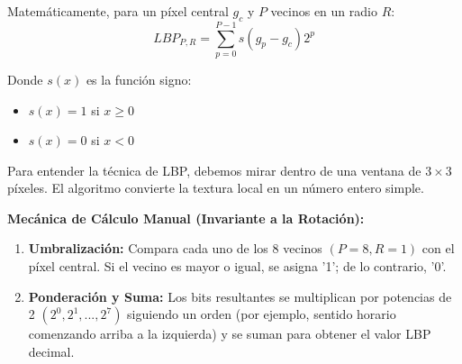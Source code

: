 Matemáticamente, para un píxel central $g_{c}$ y $P$ vecinos en un radio $R$:
\begin{equation}
    LBP_{P,R}=\sum_{p=0}^{P-1}s(g_{p}-g_{c})2^{p}
\end{equation}

Donde $s(x)$ es la función signo:
\begin{itemize}
    \item $s(x)=1$ si $x \ge 0$
    \item $s(x)=0$ si $x < 0$
\end{itemize}

Para entender la técnica de LBP, debemos mirar dentro de una ventana de $3 \times 3$
píxeles. El algoritmo convierte la textura local en un número entero simple.

\textbf{Mecánica de Cálculo Manual (Invariante a la Rotación):}
\begin{enumerate}
    \item \textbf{Umbralización:} Compara cada uno de los 8 vecinos $(P=8, R=1)$ con
          el píxel central. Si el vecino es mayor o igual, se asigna '1'; de lo contrario, '0'.
    \item \textbf{Ponderación y Suma:} Los bits resultantes se multiplican por
          potencias de 2 $(2^{0}, 2^{1}, ..., 2^{7})$ siguiendo un orden (por ejemplo,
          sentido horario comenzando arriba a la izquierda) y se suman para obtener el
          valor LBP decimal.
\end{enumerate}